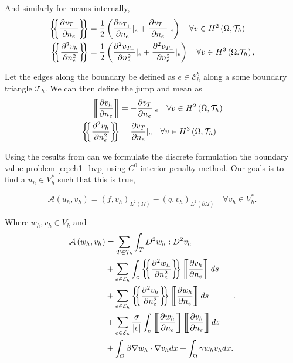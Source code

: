 And similarly for means internally,
\[
    \begin{split}
\mean{ \frac{\partial v_{T_{-}}}{\partial n_{e} } } &= \frac{1}{2} \left( \frac{\partial v_{T_{+}}}{\partial n_{e} }
|_{e} +  \frac{\partial v_{T_{-}}}{\partial n_{e} } |_{e}  \right) \quad  \forall v \in H^2\left( \Omega , \mathcal{T}
_{h} \right) \\
    \mean{ \frac{\partial ^2 v_{h}}{\partial n_{e}^2 } } &= \frac{1}{2} \left( \frac{\partial ^2 v_{T_{+}}}{\partial
    n_{e}^2  } |_{e} + \frac{\partial ^2 v_{T_{-}}}{\partial n_{e}^2  } |_{e}    \right) \quad \forall v \in  H^3\left( \Omega .
\mathcal{T}_{h}  \right), \\
    \end{split}
\]

Let the edges along the boundary be defined as $e \in  \mathcal{E} _{h}^{b}$ along a some boundary triangle $\mathcal{T}
_{h}$. We can then define the jump and mean as \[
\begin{split}
    \jump{ \frac{\partial v_{h} }{\partial n_{e} } } & = -\frac{\partial v_{T}}{\partial  n_{e}} |_{e} \quad \forall v \in
    H^2\left( \Omega , \mathcal{T}_{h}  \right) \\
    \mean{ \frac{\partial ^2 v_{h}}{\partial n_{e}^2 } } & = \frac{\partial v_{T}}{\partial  n_{e}} |_{e} \quad \forall v \in
    H^3\left( \Omega  , \mathcal{T}_{h}  \right)
\end{split}
\]

Using the results from \cite{gu2012c0} can we formulate the discrete formulation the boundary value problem
\eqref{eq:ch1_bvp} using $C^{0}$ interior penalty method. Our goals is to find a $u_{h} \in V_{h}^{*} $ such that this
is true,

\begin{equation}
\label{eq:C0-methoda}
\mathcal{A} \left( u_{h}, v_{h}  \right) = \left( f, v_{h} \right)_{L^{2}\left( \Omega  \right)} - \left( q, v_{h}
\right) _{L^{2}\left( \partial \Omega  \right)} \quad  \forall v_{h} \in V_{h}^{*}
.\end{equation}

Where $w_{h}, v_{h} \in  V_{h}$ and
\begin{equation}
\label{eq:C0-methodb}
\begin{split}
    \mathcal{A} \left( w_{h}, v_{h} \right) &=  \sum_{T \in \mathcal{T} _{h}}^{} \int_{T}^{} D^2 w_{h} : D^2 v_{h}  \\
    & + \sum_{e \in  \mathcal{E} _{h}}^{} \int_{e}^{ } \mean{ \frac{\partial ^2 w _{h}}{\partial n_{e}^2 } } \jump{
    \frac{\partial v_{h}}{\partial  n_{e}} }  ds \\
    & + \sum_{e \in \mathcal{E} _{h}}^{} \mean{ \frac{\partial ^2
v_{h}}{\partial n_{e }^2 } } \jump{ \frac{\partial w_{h}}{\partial n_{e}} }  ds \\
 &  + \sum_{e \in \mathcal{E} _{h}}^{} \frac{\sigma }{\left\lvert e \right\rvert } \int_{e}^{} \jump{ \frac{\partial
 w_{h}}{\partial n_{e}}} \jump{ \frac{\partial v_{h}}{\partial n_{e}} } ds \\
 & + \int_{\Omega }^{}  \beta \nabla w_{h} \cdot \nabla v_{h} dx + \int_{\Omega }^{} \gamma w_{h} v_{h} dx .
\end{split}
.\end{equation}

